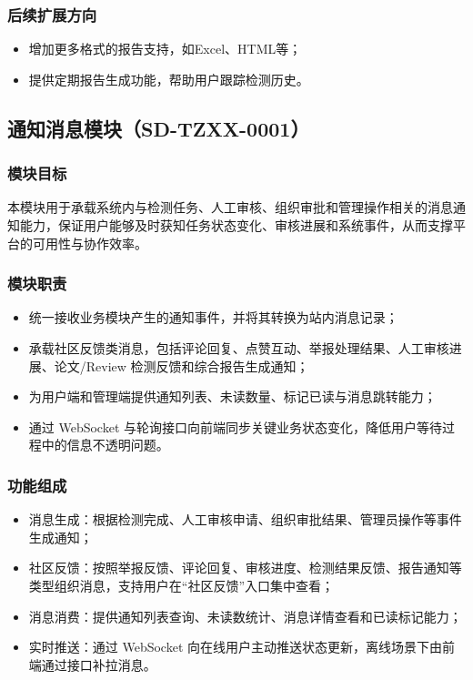 \subsubsection{后续扩展方向}
\begin{itemize}[leftmargin=2em]
    \item 增加更多格式的报告支持，如Excel、HTML等；
    \item 提供定期报告生成功能，帮助用户跟踪检测历史。
\end{itemize}

\subsection{通知消息模块（SD-TZXX-0001）}

\subsubsection{模块目标}
本模块用于承载系统内与检测任务、人工审核、组织审批和管理操作相关的消息通知能力，保证用户能够及时获知任务状态变化、审核进展和系统事件，从而支撑平台的可用性与协作效率。

\subsubsection{模块职责}
\begin{itemize}[leftmargin=2em]
    \item 统一接收业务模块产生的通知事件，并将其转换为站内消息记录；
    \item 承载社区反馈类消息，包括评论回复、点赞互动、举报处理结果、人工审核进展、论文/Review 检测反馈和综合报告生成通知；
    \item 为用户端和管理端提供通知列表、未读数量、标记已读与消息跳转能力；
    \item 通过 WebSocket 与轮询接口向前端同步关键业务状态变化，降低用户等待过程中的信息不透明问题。
\end{itemize}

\subsubsection{功能组成}
\begin{itemize}[leftmargin=2em]
    \item 消息生成：根据检测完成、人工审核申请、组织审批结果、管理员操作等事件生成通知；
    \item 社区反馈：按照举报反馈、评论回复、审核进度、检测结果反馈、报告通知等类型组织消息，支持用户在“社区反馈”入口集中查看；
    \item 消息消费：提供通知列表查询、未读数统计、消息详情查看和已读标记能力；
    \item 实时推送：通过 WebSocket 向在线用户主动推送状态更新，离线场景下由前端通过接口补拉消息。
\end{itemize}

